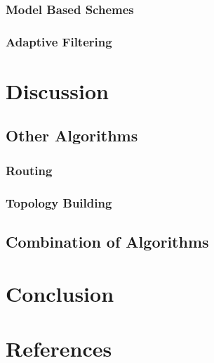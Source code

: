 \subsubsection{Model Based Schemes}
\label{sec:Model Based Schemes}


\subsubsection{Adaptive Filtering}
\label{sec:Adaptive Filtering}

\subsection{\catIII}
\label{sec:\catIII}


\section{Discussion}
\label{sec:Discussion}


\subsection{Other Algorithms}
\label{sec:Listings}

\subsubsection{Routing}
\label{sec:Listings}

\subsubsection{Topology Building}
\label{sec:Listings}


\subsection{Combination of Algorithms}
\label{sec:Listings}


\section{Conclusion}
\label{sec:Conclusion}


\section{References}
\label{sec:References}

